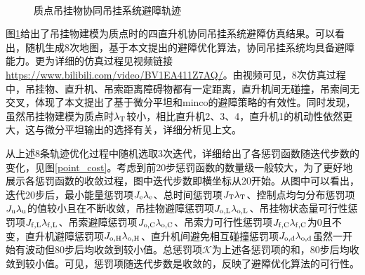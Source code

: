 \begin{figure}[htb!]
    \quad
    \\
    \caption{质点吊挂物协同吊挂系统避障轨迹\label{point_trajectory}}
\end{figure}

图\ref{point_trajectory}给出了吊挂物建模为质点时的四直升机协同吊挂系统避障仿真结果。可以看出，随机生成8次地图，基于本文提出的避障优化算法，协同吊挂系统均具备避障能力。更为详细的仿真过程见视频链接\href{https://www.bilibili.com/video/BV1EA411Z7AQ/}{https://www.bilibili.com/video/BV1EA411Z7AQ/}。由视频可见，8次仿真过程中，吊挂物、直升机、吊索距离障碍物都有一定距离，直升机间无碰撞，吊索间无交叉，体现了本文提出了基于微分平坦和minco的避障策略的有效性。同时发现，虽然吊挂物建模为质点时$\lambda_{\rm{T}}$较小，相比直升机2、3、4，直升机1的机动性依然更大，这与微分平坦输出的选择有关，详细分析见上文。

从上述8条轨迹优化过程中随机选取3次迭代，详细给出了各惩罚函数随迭代步数的变化，见图\ref{point_cost}。考虑到前20步惩罚函数的数量级一般较大，为了更好地展示各惩罚函数的收敛过程，图中迭代步数即横坐标从20开始。从图中可以看出，迭代20步后，最小能量惩罚项$J_{\rm{e}}\lambda_{\rm{e}}$、总时间惩罚项$J_{\rm{T}}\lambda_{\rm{T}}$、控制点均匀分布惩罚项$J_{\rm{u}}\lambda_{\rm{u}}$的值较小且在不断收敛，吊挂物避障惩罚项$J_{\rm{o,L}}\lambda_{\rm{o,L}}$、吊挂物状态量可行性惩罚项$J_{\rm{f,L}}\lambda_{\rm{f,L}}$、吊索避障惩罚项$J_{\rm{o,C}}\lambda_{\rm{o,C}}$、吊索力可行性惩罚项$J_{\rm{f,C}}\lambda_{\rm{f,C}}$为0且不变，直升机避障惩罚项$J_{\rm{o,H}}\lambda_{\rm{o,H}}$、直升机间避免相互碰撞惩罚项$J_{\rm{o,d}}\lambda_{\rm{o,d}}$虽然一开始有波动但80步后均收敛到较小值。总惩罚项$\mathcal{K}$为上述各惩罚项的和，80步后均收敛到较小值。可见，惩罚项随迭代步数是收敛的，反映了避障优化算法的可行性。

